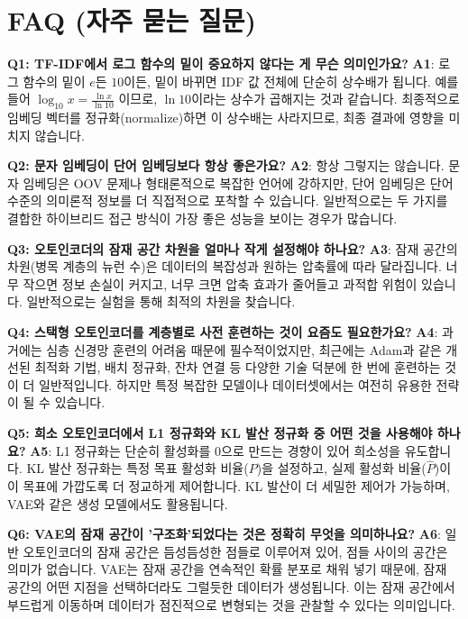 \documentclass[11pt,a4paper]{article}
\theoremstyle{definition}
\begin{document}
\newpage
\section{FAQ (자주 묻는 질문)}

\begin{summarybox}
\textbf{Q1: TF-IDF에서 로그 함수의 밑이 중요하지 않다는 게 무슨 의미인가요?}
\textbf{A1}: 로그 함수의 밑이 $e$든 $10$이든, 밑이 바뀌면 IDF 값 전체에 단순히 상수배가 됩니다. 예를 들어 $\log_{10} x = \frac{\ln x}{\ln 10}$ 이므로, $\ln 10$이라는 상수가 곱해지는 것과 같습니다. 최종적으로 임베딩 벡터를 정규화(normalize)하면 이 상수배는 사라지므로, 최종 결과에 영향을 미치지 않습니다.

\textbf{Q2: 문자 임베딩이 단어 임베딩보다 항상 좋은가요?}
\textbf{A2}: 항상 그렇지는 않습니다. 문자 임베딩은 OOV 문제나 형태론적으로 복잡한 언어에 강하지만, 단어 임베딩은 단어 수준의 의미론적 정보를 더 직접적으로 포착할 수 있습니다. 일반적으로는 두 가지를 결합한 하이브리드 접근 방식이 가장 좋은 성능을 보이는 경우가 많습니다.

\textbf{Q3: 오토인코더의 잠재 공간 차원을 얼마나 작게 설정해야 하나요?}
\textbf{A3}: 잠재 공간의 차원(병목 계층의 뉴런 수)은 데이터의 복잡성과 원하는 압축률에 따라 달라집니다. 너무 작으면 정보 손실이 커지고, 너무 크면 압축 효과가 줄어들고 과적합 위험이 있습니다. 일반적으로는 실험을 통해 최적의 차원을 찾습니다.

\textbf{Q4: 스택형 오토인코더를 계층별로 사전 훈련하는 것이 요즘도 필요한가요?}
\textbf{A4}: 과거에는 심층 신경망 훈련의 어려움 때문에 필수적이었지만, 최근에는 Adam과 같은 개선된 최적화 기법, 배치 정규화, 잔차 연결 등 다양한 기술 덕분에 한 번에 훈련하는 것이 더 일반적입니다. 하지만 특정 복잡한 모델이나 데이터셋에서는 여전히 유용한 전략이 될 수 있습니다.

\textbf{Q5: 희소 오토인코더에서 L1 정규화와 KL 발산 정규화 중 어떤 것을 사용해야 하나요?}
\textbf{A5}: L1 정규화는 단순히 활성화를 0으로 만드는 경향이 있어 희소성을 유도합니다. KL 발산 정규화는 특정 목표 활성화 비율($P$)을 설정하고, 실제 활성화 비율($\hat{P}$)이 이 목표에 가깝도록 더 정교하게 제어합니다. KL 발산이 더 세밀한 제어가 가능하며, VAE와 같은 생성 모델에서도 활용됩니다.

\textbf{Q6: VAE의 잠재 공간이 '구조화'되었다는 것은 정확히 무엇을 의미하나요?}
\textbf{A6}: 일반 오토인코더의 잠재 공간은 듬성듬성한 점들로 이루어져 있어, 점들 사이의 공간은 의미가 없습니다. VAE는 잠재 공간을 연속적인 확률 분포로 채워 넣기 때문에, 잠재 공간의 어떤 지점을 선택하더라도 그럴듯한 데이터가 생성됩니다. 이는 잠재 공간에서 부드럽게 이동하며 데이터가 점진적으로 변형되는 것을 관찰할 수 있다는 의미입니다.
\end{summarybox}
\end{document}
